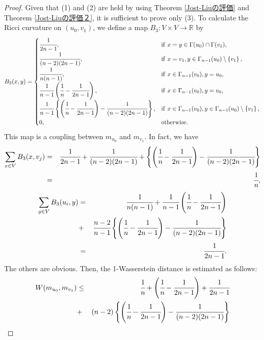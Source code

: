 \documentclass[leqno,12pt]{amsart} %
\theoremstyle{plain} %
\theoremstyle{definition} %
\begin{document}
\begin{proof}
Given that (1) and (2) are held by using Theorem \ref{Jost-Liuの評価} and Theorem \ref{Jost-Liuの評価２}, it is sufficient to prove only (3). To calculate the Ricci curvature on $(u_0, v_1)$, we define a map $B_3 : V \times V \to \mathbb{R}$ by
\begin{eqnarray*}
B_3 (x, y)=
\begin{cases}
\cfrac{1}{2n-1}, & \mathrm{if}\ x=y \in \Gamma(u_0)\cap \Gamma(v_1),\\
\cfrac{1}{(n-2)(2n-1)}, & \mathrm{if}\ x=v_1, y \in \Gamma_{n-1} (u_0) \setminus \left\{ v_1 \right\},\\
\cfrac{1}{n( n-1 )}, & \mathrm{if}\ x \in \Gamma_{n-1} (v_0), y=u_0,\\
\cfrac{1}{n-1} \left( \cfrac{1}{n} - \cfrac{1}{2n-1} \right), & \mathrm{if}\ x \in \Gamma_{n-1} (v_0), y = v_0,\\
\cfrac{1}{n-1} \left\{ \left( \cfrac{1}{n} - \cfrac{1}{2n-1} \right) - \cfrac{1}{(n-2)(2n-1)} \right\}, & \mathrm{if}\ x \in \Gamma_{n-1} (v_0), y \in \Gamma_{n-1} (u_0) \setminus \left\{ v_1 \right\}, \\
0, & \mathrm{otherwise}.
\end{cases}
\end{eqnarray*}
This map is a coupling between $m_{u_0}$ and $m_{v_1}$. In fact, we have
\begin{eqnarray*}
\sum_{x \in V} B_3 (x, v_j) &=& \cfrac{1}{2n-1} + \cfrac{1}{(n-2)(2n-1)}+ \left\{ \left( \cfrac{1}{n} - \cfrac{1}{2n-1} \right) - \cfrac{1}{(n-2)(2n-1)} \right\}\\ 
&=& \cfrac{1}{n},
\end{eqnarray*}
\begin{eqnarray*}
\sum_{y \in V} B_3 (u_i, y) &=& \cfrac{1}{n( n-1 )}+ \cfrac{1}{n-1} \left( \cfrac{1}{n} - \cfrac{1}{2n-1} \right)\\
&+& \cfrac{n-2}{n-1} \left\{ \left( \cfrac{1}{n} - \cfrac{1}{2n-1} \right) - \cfrac{1}{(n-2)(2n-1)} \right\} \\
&=& \cfrac{1}{2n-1}.
\end{eqnarray*}
The others are obvious. Then, the 1-Wasserstein distance is estimated as follows:
\begin{eqnarray*}
W(m_{u_0}, m_{v_1}) &\leq& \cfrac{1}{n} +  \left( \cfrac{1}{n} - \cfrac{1}{2n-1} \right) +  \cfrac{1}{2n-1} \\
&+& (n-2)\left\{ \left( \cfrac{1}{n} - \cfrac{1}{2n-1} \right) - \cfrac{1}{(n-2)(2n-1)} \right\}\\

\end{eqnarray*}
\end{proof}
\end{document}
